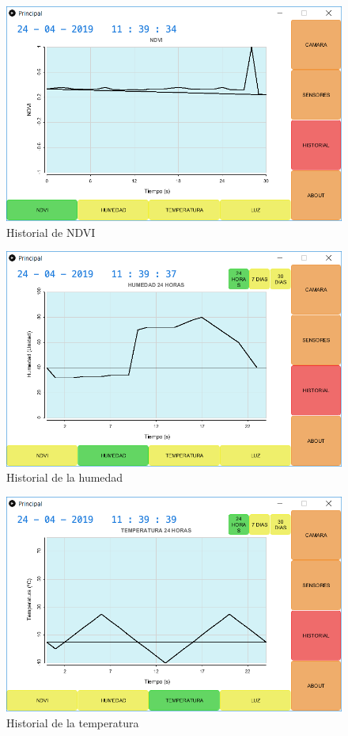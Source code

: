 \documentclass[12pt]{article}
\begin{document}
\begin{figure}[H]
	\centering
	\includegraphics[scale=.6]{ndvi}
	\caption{Historial de NDVI}
	\label{fig:ndvi}
\end{figure}

\begin{figure}[H]
	\centering
	\includegraphics[scale=.6]{humed}
	\caption{Historial de la humedad}
	\label{fig:humed}
\end{figure}

\begin{figure}[H]
	\centering
	\includegraphics[scale=.6]{temp}
	\caption{Historial de la temperatura}
	\label{fig:temp}
\end{figure}
\end{document}
